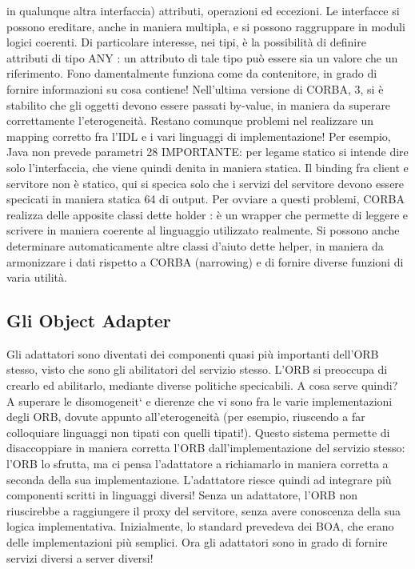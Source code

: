 in qualunque altra interfaccia) attributi, operazioni ed eccezioni. Le interfacce
si possono ereditare, anche in maniera multipla, e si possono raggruppare in
moduli logici coerenti.
Di particolare interesse, nei tipi, è la possibilità di definire attributi di tipo
ANY : un attributo di tale tipo può essere sia un valore che un riferimento. Fono
damentalmente funziona come da contenitore, in grado di fornire informazioni
su cosa contiene! Nell'ultima versione di CORBA, 3, si è stabilito che gli
oggetti devono essere passati by-value, in maniera da superare correttamente
l'eterogeneità.
Restano comunque problemi nel realizzare un mapping corretto fra l'IDL e
i vari linguaggi di implementazione! Per esempio, Java non prevede parametri
28 IMPORTANTE: per legame statico si intende dire solo l'interfaccia, che viene quindi
denita in maniera statica. Il binding fra client e servitore non è statico, qui si specica solo
che i servizi del servitore devono essere specicati in maniera statica
64
di output. Per ovviare a questi problemi, CORBA realizza delle apposite classi dette holder : è un wrapper che permette
di leggere e scrivere in maniera
coerente al linguaggio utilizzato realmente. Si possono anche determinare automaticamente altre classi d'aiuto dette
helper, in maniera da armonizzare i dati
rispetto a CORBA (narrowing) e di fornire diverse funzioni di varia utilità.
\subsection{Gli Object Adapter}
Gli adattatori sono diventati dei componenti quasi più importanti dell'ORB
stesso, visto che sono gli abilitatori del servizio stesso. L'ORB si preoccupa di
crearlo ed abilitarlo, mediante diverse politiche specicabili.
A cosa serve quindi? A superare le disomogeneit` e dierenze che vi sono
fra le varie implementazioni degli ORB, dovute appunto all'eterogeneità (per
esempio, riuscendo a far colloquiare linguaggi non tipati con quelli tipati!).
Questo sistema permette di disaccoppiare in maniera corretta l'ORB dall'implementazione del servizio stesso: l'ORB lo
sfrutta, ma ci pensa l'adattatore a
richiamarlo in maniera corretta a seconda della sua implementazione. L'adattatore riesce quindi ad integrare più
componenti scritti in linguaggi diversi! Senza
un adattatore, l'ORB non riuscirebbe a raggiungere il proxy del servitore, senza
avere conoscenza della sua logica implementativa.
Inizialmente, lo standard prevedeva dei BOA, che erano delle implementazioni più semplici. Ora gli adattatori sono in
grado di fornire servizi diversi a
server diversi!
